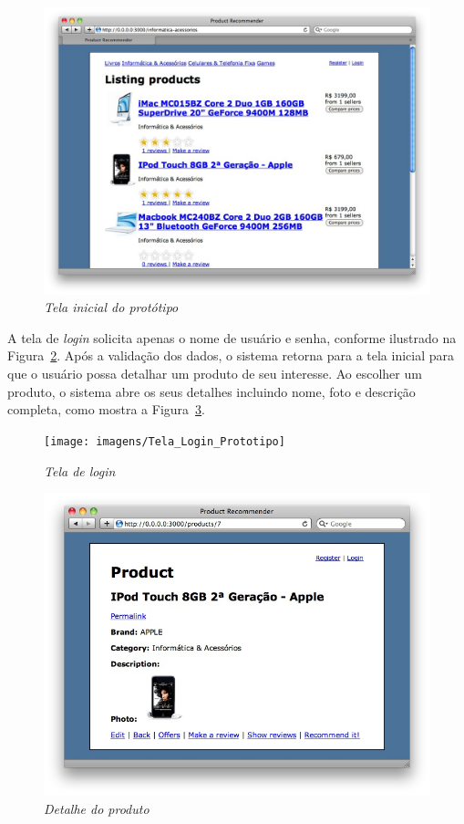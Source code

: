 \begin{figure}
  \centering
  \includegraphics[width=\textwidth]{imagens/Tela_Inicial_Prototipo}
  \caption{\it Tela inicial do protótipo}
  \label{fig:tela_inicial_prototipo}
\end{figure}

 A tela de \textit{login} solicita apenas o nome de usuário e senha, conforme ilustrado na Figura~\ref{fig:tela_login_prototipo}. Após a validação dos dados, o sistema retorna para a tela inicial para que o usuário possa detalhar um produto de seu interesse. Ao escolher um produto, o sistema abre os seus detalhes incluindo nome, foto e descrição completa, como mostra a Figura~\ref{fig:detalhe_produto_prototipo}.
 
\begin{figure}
  \centering
  \texttt{[image: imagens/Tela\_Login\_Prototipo]}
  \caption{\it Tela de login}
  \label{fig:tela_login_prototipo}
\end{figure}

\begin{figure}
  \centering
  \includegraphics[width=\textwidth]{imagens/Detalhe_Produto_Prototipo}
  \caption{\it Detalhe do produto}
  \label{fig:detalhe_produto_prototipo}
\end{figure}